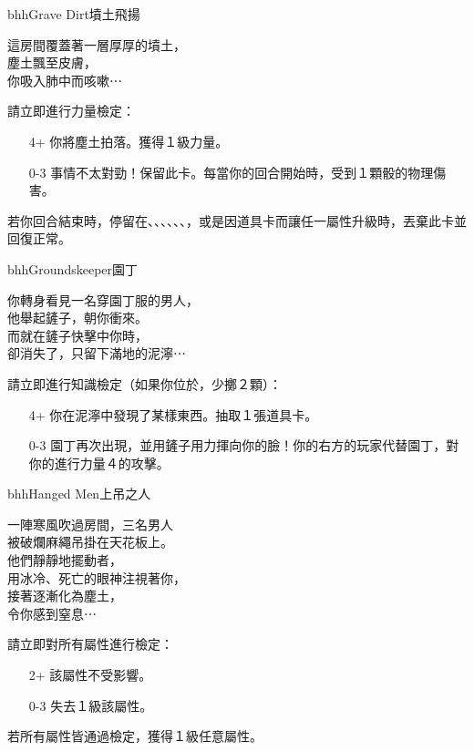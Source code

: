 \linebreak[0]%
\begin{EventCard}{bhh}{Grave Dirt}{墳土飛揚}
  \begin{CardStory}
    這房間覆蓋著一層厚厚的墳土，\\
    塵土飄至皮膚，\\
    你吸入肺中而咳嗽⋯
  \end{CardStory}
  請立即進行力量檢定：
  \begin{itemize}
    \item[4+] 你將塵土拍落。獲得１級力量。
    \item[0-3] 事情不太對勁！保留此卡。每當你的回合開始時，受到１顆骰的物理傷害。
  \end{itemize}
  若你回合結束時，停留在、、、、、、，或是因道具卡而讓任一屬性升級時，丟棄此卡並回復正常。\\[0.5em]
\end{EventCard}%
\linebreak[0]%
\begin{EventCard}{bhh}{Groundskeeper}{園丁}
  \begin{CardStory}
    你轉身看見一名穿園丁服的男人，\\
    他舉起鏟子，朝你衝來。\\
    而就在鏟子快擊中你時，\\
    卻消失了，只留下滿地的泥濘⋯
  \end{CardStory}
  請立即進行知識檢定（如果你位於，少擲２顆）：
  \begin{itemize}
    \item[4+] 你在泥濘中發現了某樣東西。抽取１張道具卡。
    \item[0-3] 園丁再次出現，並用鏟子用力揮向你的臉！你的右方的玩家代替園丁，對你的進行力量４的攻擊。
  \end{itemize}
\end{EventCard}%
\linebreak[0]%
\begin{EventCard}{bhh}{Hanged Men}{上吊之人}
  \begin{CardStory}
    一陣寒風吹過房間，三名男人\\
    被破爛麻繩吊掛在天花板上。\\
    他們靜靜地擺動者，\\
    用冰冷、死亡的眼神注視著你，\\
    接著逐漸化為塵土，\\
    令你感到窒息⋯
  \end{CardStory}
  請立即對所有屬性進行檢定：
  \begin{itemize}
    \item[2+] 該屬性不受影響。
    \item[0-3] 失去１級該屬性。
  \end{itemize}
  若所有屬性皆通過檢定，獲得１級任意屬性。\\[0.5em]
\end{EventCard}%
